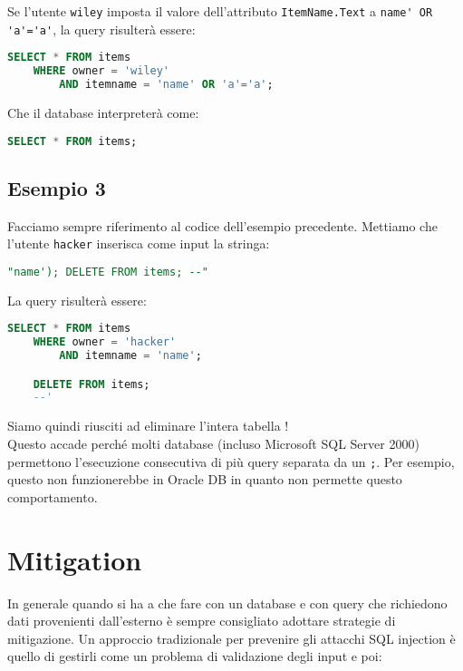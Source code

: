Se l'utente \verb|wiley| imposta il valore dell'attributo \verb|ItemName.Text|
a \verb|name' OR 'a'='a'|, la query risulterà essere:

\begin{lstlisting}[language=SQL]
    SELECT * FROM items
    WHERE owner = 'wiley'
        AND itemname = 'name' OR 'a'='a';
\end{lstlisting}

Che il database interpreterà come:

\begin{lstlisting}[language=SQL]
    SELECT * FROM items;
\end{lstlisting}

\subsection{Esempio 3}

Facciamo sempre riferimento al codice dell'esempio precedente.
Mettiamo che l'utente \verb|hacker| inserisca come input la stringa:

\begin{lstlisting}[language=SQL]
    "name'); DELETE FROM items; --"
\end{lstlisting}

La query risulterà essere:

\begin{lstlisting}[language=SQL]
    SELECT * FROM items
    WHERE owner = 'hacker'
        AND itemname = 'name';

    DELETE FROM items;
    --'
\end{lstlisting}

Siamo quindi riusciti ad eliminare l'intera tabella !\\
Questo accade perché molti database (incluso Microsoft SQL Server 2000)
permettono l'esecuzione consecutiva di più query separata da un \verb|;|.
Per esempio, questo non funzionerebbe in Oracle DB in quanto non permette questo
comportamento.

\section{Mitigation}

In generale quando si ha a che fare con un database e con query che richiedono dati
provenienti dall'esterno è sempre consigliato adottare strategie di mitigazione.
Un approccio tradizionale per prevenire gli attacchi SQL injection è quello di
gestirli come un
problema di validazione degli input e poi:

